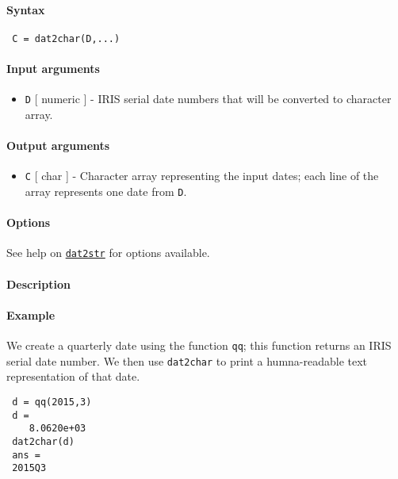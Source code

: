 


	\paragraph{Syntax}
 
 \begin{verbatim}
 C = dat2char(D,...)
 \end{verbatim}
 
 \paragraph{Input arguments}
 
 \begin{itemize}
 \item
   \texttt{D} {[} numeric {]} - IRIS serial date numbers that will be
   converted to character array.
 \end{itemize}
 
 \paragraph{Output arguments}
 
 \begin{itemize}
 \item
   \texttt{C} {[} char {]} - Character array representing the input
   dates; each line of the array represents one date from \texttt{D}.
 \end{itemize}
 
 \paragraph{Options}
 
 See help on \href{dates/dat2str}{\texttt{dat2str}} for options
 available.
 
 \paragraph{Description}
 
 \paragraph{Example}
 
 We create a quarterly date using the function \texttt{qq}; this function
 returns an IRIS serial date number. We then use \texttt{dat2char} to
 print a humna-readable text representation of that date.
 
 \begin{verbatim}
 d = qq(2015,3)
 d =
    8.0620e+03
 dat2char(d)
 ans =
 2015Q3
 \end{verbatim}


